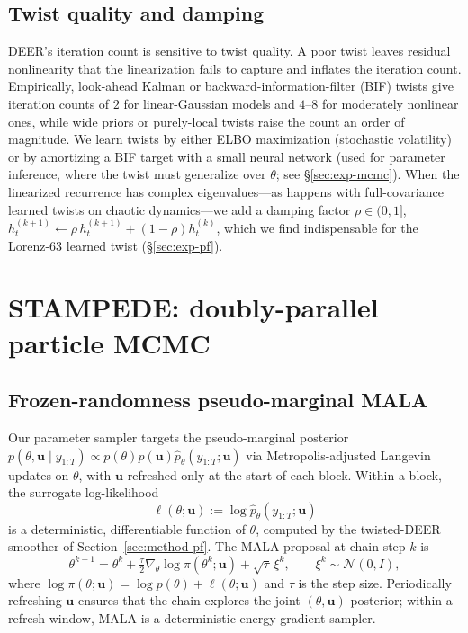 \documentclass{article}
\begin{document}
\subsection{Twist quality and damping}
\label{sec:twist-damping}
DEER's iteration count is sensitive to twist quality. A poor twist leaves residual nonlinearity that the linearization fails to capture and inflates the iteration count. Empirically, look-ahead Kalman or backward-information-filter (BIF) twists give iteration counts of $2$ for linear-Gaussian models and $4$--$8$ for moderately nonlinear ones, while wide priors or purely-local twists raise the count an order of magnitude. We learn twists by either ELBO maximization (stochastic volatility) or by amortizing a BIF target with a small neural network (used for parameter inference, where the twist must generalize over $\theta$; see \S\ref{sec:exp-mcmc}). When the linearized recurrence has complex eigenvalues---as happens with full-covariance learned twists on chaotic dynamics---we add a damping factor $\rho \in (0, 1]$, $h_t^{(k+1)} \leftarrow \rho \, h_t^{(k+1)} + (1 - \rho) h_t^{(k)}$, which we find indispensable for the Lorenz-63 learned twist (\S\ref{sec:exp-pf}).

\section{STAMPEDE: doubly-parallel particle MCMC}
\label{sec:method-stampede}

\subsection{Frozen-randomness pseudo-marginal MALA}
Our parameter sampler targets the pseudo-marginal posterior $p(\theta, \mathbf{u} \mid y_{1:T}) \propto p(\theta) p(\mathbf{u}) \hat{p}_\theta(y_{1:T}; \mathbf{u})$ \citep{deligiannidis2018correlated} via Metropolis-adjusted Langevin updates on $\theta$, with $\mathbf{u}$ refreshed only at the start of each block. Within a block, the surrogate log-likelihood
\begin{equation}
    \ell(\theta; \mathbf{u}) := \log \hat{p}_\theta(y_{1:T}; \mathbf{u})
\end{equation}
is a deterministic, differentiable function of $\theta$, computed by the twisted-DEER smoother of Section~\ref{sec:method-pf}. The MALA proposal at chain step $k$ is
\begin{equation}
    \theta^{k+1} = \theta^{k} + \tfrac{\tau}{2} \nabla_\theta \log \pi(\theta^{k}; \mathbf{u}) + \sqrt{\tau} \, \xi^{k}, \qquad \xi^{k} \sim \mathcal{N}(0, I),
    \label{eq:mala-proposal}
\end{equation}
where $\log \pi(\theta; \mathbf{u}) = \log p(\theta) + \ell(\theta; \mathbf{u})$ and $\tau$ is the step size. Periodically refreshing $\mathbf{u}$ ensures that the chain explores the joint $(\theta, \mathbf{u})$ posterior; within a refresh window, MALA is a deterministic-energy gradient sampler.
\end{document}
